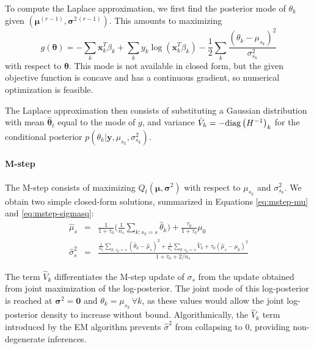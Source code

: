To compute the Laplace approximation, we first find the posterior mode of
$\theta_k$ given $(\bm \mu^{(r-1)}, \bm \sigma^{2\,(r-1)})$. This amounts to
maximizing
\begin{equation}\label{eq:gFunction}
 g(\bm \theta) = -\sum_k \bm x_k^T \beta_k +
\sum_k y_k \log \left( \bm x_k^T \beta_k \right) -
\frac{1}{2} \sum_k \frac{(\theta_k - \mu_{s_k})^2}{\sigma^2_{s_k}}
\end{equation}
with respect to $\bm \theta$.
This mode is not available in closed form, but the given objective function is concave and has a continuous gradient, so numerical optimization is feasible.

%
The Laplace approximation then consists of substituting a Gaussian distribution with mean $\bm \hat{\theta}_t$ equal to the mode of $g$, and variance $\hat{V}_k = -\mathrm{diag}\left(H^{-1}\right)_k$ for the conditional posterior $p(\theta_k | \bm y, \mu_{s_k}, \sigma^2_{s_k} )$.

\paragraph{M-step}
%
The M-step consists of maximizing $Q_t(\bm \mu, \bm \sigma^2)$ with respect to $\mu_{s_k}$ and $\sigma^2_{s_k}$.
We obtain two simple closed-form solutions, summarized in Equations \ref{eq:mstep-mu} and \ref{eq:mstep-sigmasq}:
\begin{eqnarray} \label{eq:mstep-mu}
\hat{\mu}_{s} &=& \frac{1}{1 + \tau_0} \Big(\frac{1}{n_s}
 \sum_{k:s_k = s} \hat{\theta}_k \Big) +
 \frac{\tau_0}{1 + \tau_0} \mu_0 \\ \label{eq:mstep-sigmasq}
\hat{\sigma}^2_{s} &=& \frac{\frac{1}{n_s} \sum_{k:s_k = s}
 (\hat{\theta}_k - \hat{\mu}_{s})^2
 + \frac{1}{n_s} \sum_{k:s_k = s} \hat{V}_k +
 \tau_0 (\hat{\mu}_s - \mu_0)^2}{1+\tau_0 + 2 / n_s}
\end{eqnarray}

The term $\hat{V}_k$ differentiates the M-step update of $\sigma_s$ from the update obtained from joint maximization of the log-posterior.
The joint mode of this log-posterior is reached at $\bm \sigma^2 = \bm 0$ and $\theta_k = \mu_{s_k} \, \forall k$, as these values would allow the joint log-posterior density to increase without bound.
Algorithmically, the $\hat{V}_k$ term introduced by the EM algorithm prevents $\hat{\sigma}^2$ from collapsing to $0$, providing non-degenerate inferences.

